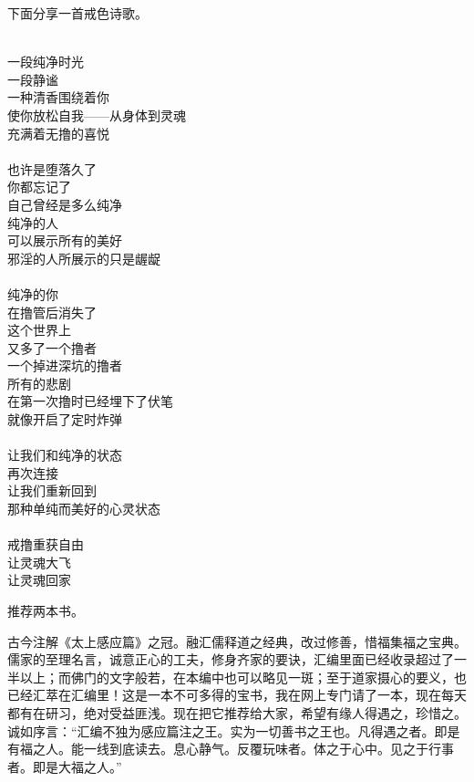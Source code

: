 下面分享一首戒色诗歌。

\begin{poem}[让灵魂回家]
    \begin{multicols}{3}
        \centering~\\
        一段纯净时光 \\ 一段静谧 \\ 一种清香围绕着你 \\ 使你放松自我——从身体到灵魂 \\ 充满着无撸的喜悦\\~\\
        也许是堕落久了 \\ 你都忘记了 \\ 自己曾经是多么纯净 \\ 纯净的人 \\ 可以展示所有的美好 \\ 邪淫的人所展示的只是龌龊\\~\\
        纯净的你 \\ 在撸管后消失了 \\ 这个世界上 \\ 又多了一个撸者 \\ 一个掉进深坑的撸者 \\ 所有的悲剧 \\ 在第一次撸时已经埋下了伏笔 \\ 就像开启了定时炸弹\\~\\
        让我们和纯净的状态 \\ 再次连接 \\ 让我们重新回到 \\ 那种单纯而美好的心灵状态\\~\\
        戒撸重获自由 \\ 让灵魂大飞 \\ 让灵魂回家
    \end{multicols}
\end{poem}

推荐两本书。

\begin{book}[《感应篇汇编》]
    古今注解《太上感应篇》之冠。融汇儒释道之经典，改过修善，惜福集福之宝典。儒家的至理名言，诚意正心的工夫，修身齐家的要诀，汇编里面已经收录超过了一半以上；而佛门的文字般若，在本编中也可以略见一斑；至于道家摄心的要义，也已经汇萃在汇编里！这是一本不可多得的宝书，我在网上专门请了一本，现在每天都有在研习，绝对受益匪浅。现在把它推荐给大家，希望有缘人得遇之，珍惜之。诚如序言：“汇编不独为感应篇注之王。实为一切善书之王也。凡得遇之者。即是有福之人。能一线到底读去。息心静气。反覆玩味者。体之于心中。见之于行事者。即是大福之人。”
\end{book}

